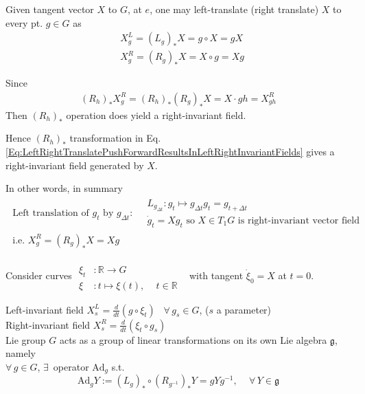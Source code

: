 \documentclass[10pt]{amsart}
\begin{document}
\begin{multicols*}{2}
Given tangent vector $X$ to $G$, at $e$, one may left-translate (right translate) $X$ to every pt. $g\in G$ as 
\begin{equation}\label{Eq:LeftRightTranslatePushForwardResultsInLeftRightInvariantFields}
\begin{aligned}
	& X^L_g = (L_g)_* X = g\circ X = gX \\
	& X^R_g = (R_g)_* X = X\circ g = Xg 
\end{aligned}	
\end{equation}

Since
\[
\begin{gathered}
	(R_h)_* X^R_g = (R_h)_*(R_g)_* X = X\cdot gh = X^R_{gh}
\end{gathered}
\]
Then $(R_h)_*$ operation does yield a right-invariant field.

Hence $(R_h)_*$ transformation in Eq. \ref{Eq:LeftRightTranslatePushForwardResultsInLeftRightInvariantFields} gives a right-invariant field generated by $X$. 

In other words, in summary
\begin{equation}\label{Eq:LeftTranslationRightInvariantVectorField}
\begin{gathered}
\text{ Left translation of  $g_t$ by $g_{\Delta t}$: } \begin{aligned}
& L_{g_{\Delta t}} : g_t \mapsto g_{\Delta t} g_t = g_{t+\Delta t } \\
& \dot{g}_t = X g_t  \text{ so } X \in T_1G \text{ is right-invariant vector field }
\end{aligned} \\
\text{ i.e. } X^R_g = (R_g)_*X = Xg
\end{gathered}
\end{equation}

Consider curves $\begin{aligned} & \quad \\ 
	\xi_t & :   \mathbb{R} \to G \\ 
	\xi  & : t \mapsto \xi(t), \quad \, t\in \mathbb{R} \end{aligned}$ \quad \, with tangent $\dot{\xi}_0 = X$ at $t=0$.

Left-invariant field $X_s^L = \frac{d}{dt} (g\circ \xi_t)$ \quad \, $\forall \, g_s \in G$, ($s$ a parameter) \\
Right-invariant field $X_s^R = \frac{d}{dt} ( \xi_t \circ g_s)$ \\

Lie group $G$ acts as a group of linear transformations on its own Lie algebra $\mathfrak{g}$, namely \\
$\forall \, g\in G$, $\exists \, $ operator $\text{Ad}_g$ s.t. 
\begin{equation}
	\text{Ad}_g Y := (L_g)_* \circ (R_{g^{-1}})_* Y = gYg^{-1}, \quad \, \forall \, Y \in \mathfrak{g}
\end{equation}


\end{multicols*}
\end{document}
